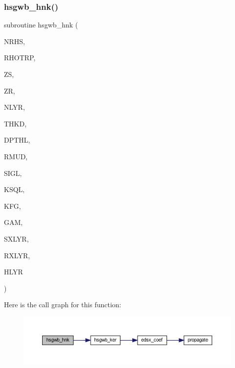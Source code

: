 \subsubsection{\texorpdfstring{hsgwb\+\_\+hnk()}{hsgwb\_hnk()}}
{\footnotesize\ttfamily subroutine hsgwb\+\_\+hnk (\begin{DoxyParamCaption}\item[{integer}]{N\+R\+HS,  }\item[{real, dimension(nrhs)}]{R\+H\+O\+T\+RP,  }\item[{real(kind=ql)}]{ZS,  }\item[{real(kind=ql)}]{ZR,  }\item[{integer}]{N\+L\+YR,  }\item[{real(kind=ql), dimension (nlyr)}]{T\+H\+KD,  }\item[{real(kind=ql), dimension (nlyr)}]{D\+P\+T\+HL,  }\item[{real(kind=ql), dimension(0\+:nlyr)}]{R\+M\+UD,  }\item[{complex(kind=ql), dimension (nlyr)}]{S\+I\+GL,  }\item[{complex(kind=ql), dimension (nlyr)}]{K\+S\+QL,  }\item[{integer}]{K\+FG,  }\item[{integer}]{G\+AM,  }\item[{integer}]{S\+X\+L\+YR,  }\item[{integer}]{R\+X\+L\+YR,  }\item[{complex, dimension(nrhs,3)}]{H\+L\+YR }\end{DoxyParamCaption})}

Here is the call graph for this function\+:\nopagebreak
\begin{figure}[H]
\begin{center}
\leavevmode
\includegraphics[width=350pt]{Leroi__c_8f90_a8e78b7efe3dc41645eaf9123100f4fc1_cgraph}
\end{center}
\end{figure}
\mbox{\label{Leroi__c_8f90_ad4730d65d0e42fe38f0f174339af3c71}} 
